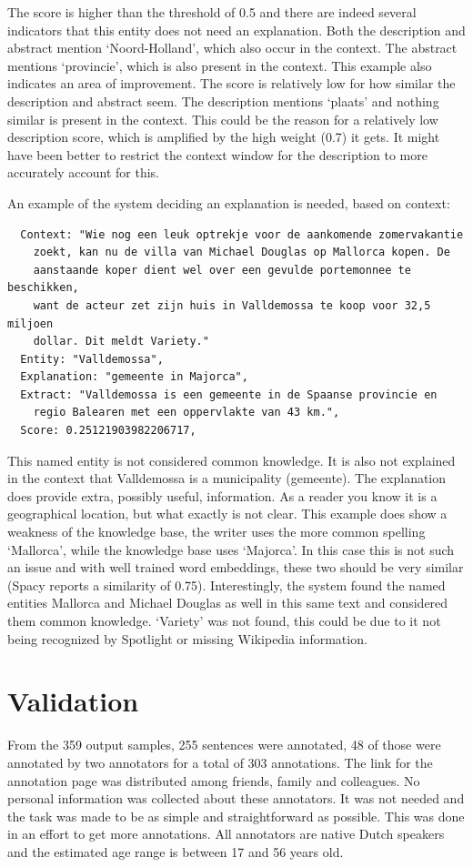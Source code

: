 \documentclass[
10pt, %
a4paper, %
oneside, %
headinclude,footinclude, %
] {book}%
\begin{document}
The score is higher than the threshold of 0.5 and there are indeed several indicators that this entity does not need an explanation.
Both the description and abstract mention `Noord-Holland', which also occur in the context.
The abstract mentions `provincie', which is also present in the context.
This example also indicates an area of improvement. 
The score is relatively low for how similar the description and abstract seem.
The description mentions `plaats' and nothing similar is present in the context.
This could be the reason for a relatively low description score, which is amplified by the high weight (0.7) it gets.
It might have been better to restrict the context window for the description to more accurately account for this.

An example of the system deciding an explanation is needed, based on context:

\begin{verbatim}
  Context: "Wie nog een leuk optrekje voor de aankomende zomervakantie
    zoekt, kan nu de villa van Michael Douglas op Mallorca kopen. De
    aanstaande koper dient wel over een gevulde portemonnee te beschikken,
    want de acteur zet zijn huis in Valldemossa te koop voor 32,5 miljoen
    dollar. Dit meldt Variety."
  Entity: "Valldemossa",
  Explanation: "gemeente in Majorca",
  Extract: "Valldemossa is een gemeente in de Spaanse provincie en
    regio Balearen met een oppervlakte van 43 km.",
  Score: 0.25121903982206717,
\end{verbatim}

This named entity is not considered common knowledge. 
It is also not explained in the context that Valldemossa is a municipality (gemeente).
The explanation does provide extra, possibly useful, information.
As a reader you know it is a geographical location, but what exactly is not clear.
This example does show a weakness of the knowledge base, the writer uses the more common spelling `Mallorca', while the knowledge base uses `Majorca'.
In this case this is not such an issue and with well trained word embeddings, these two should be very similar (Spacy reports a similarity of 0.75).
Interestingly, the system found the named entities Mallorca and Michael Douglas as well in this same text and considered them common knowledge.
`Variety' was not found, this could be due to it not being recognized by Spotlight or missing Wikipedia information.

\section{Validation}
From the 359 output samples, 255 sentences were annotated, 48 of those were annotated by two annotators for a total of 303 annotations.
The link for the annotation page was distributed among friends, family and colleagues.
No personal information was collected about these annotators.
It was not needed and the task was made to be as simple and straightforward as possible.
This was done in an effort to get more annotations.
All annotators are native Dutch speakers and the estimated age range is between 17 and 56 years old.
\end{document}
